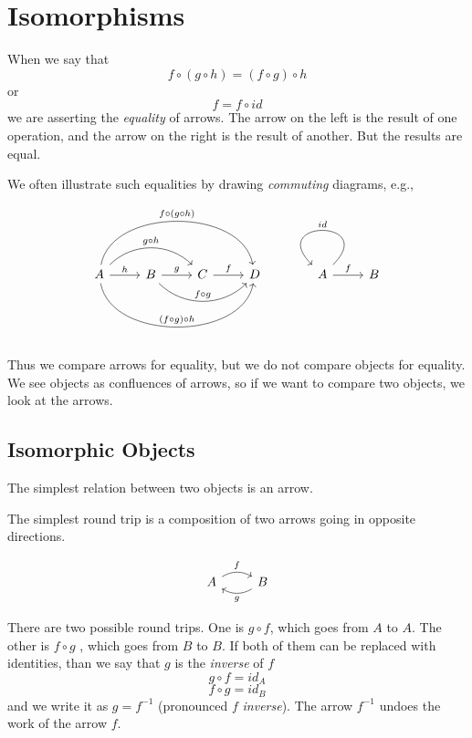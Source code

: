 \documentclass[DaoFP]{subfiles}
\begin{document}
\setcounter{chapter}{2}


\chapter{Isomorphisms}

When we say that 
\[f \circ (g \circ h) = (f \circ g) \circ h \]
or
\[ f = f \circ id \]
we are asserting the \emph{equality} of arrows. The arrow on the left is the result of one operation, and the arrow on the right is the result of another. But the results are equal.

We often illustrate such equalities by drawing \emph{commuting} diagrams, e.g.,

\[
 \begin{tikzcd}
 A
 \arrow[r, "h"]
 \arrow[rr, bend left=45, "g \circ h"]
 \arrow[rrr, bend left=80, "f \circ (g \circ h)"]
 \arrow[rrr, bend right=80, "(f \circ g) \circ h"]
 & B
 \arrow[r, "g"]
 \arrow[rr, bend right=45, "f \circ g"]
 &C
 \arrow[r, "f"]
 &D
 \end{tikzcd}
 \begin{tikzcd}
 A
 \arrow[r, "f"]
 \arrow[r, loop, "id"']
 &B
 \end{tikzcd}
\]

Thus we compare arrows for equality, but we do not compare objects for equality. We see objects as confluences of arrows, so if we want to compare two objects, we look at the arrows.

\section{Isomorphic Objects}

The simplest relation between two objects is an arrow.

The simplest round trip is a composition of two arrows going in opposite directions. 

\[
 \begin{tikzcd}
 A
 \arrow[r, bend left, "f"]
 & B
 \arrow[l, bend left, "g"]
 \end{tikzcd}
\]

There are two possible round trips. One is $g \circ f$, which goes from $A$ to $A$. The other is $f \circ g$ , which goes from $B$ to $B$. If both of them can be replaced with identities, than we say that $g$ is the \emph{inverse} of $f$
\[ g \circ f = id_A\]
\[f \circ g = id_B\]
and we write it as $g = f^{-1}$ (pronounced $f$ \emph{inverse}). The arrow $ f^{-1}$ undoes the work of the arrow $f$. 
\end{document}
